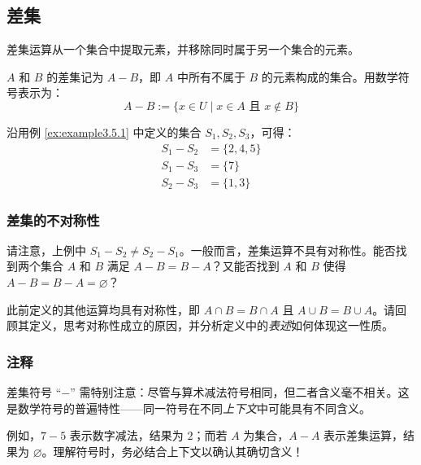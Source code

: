 \subsection{差集}

差集运算从一个集合中提取元素，并移除同时属于另一个集合的元素。

\begin{definition}
    $A$ 和 $B$ 的差集记为 $A - B$，即 $A$ 中所有不属于 $B$ 的元素构成的集合。用数学符号表示为：
    \[A - B := \{x \in U \mid x \in A \text{\ 且\ } x \notin B\}\]
\end{definition}

\begin{example}
    沿用例 \ref{ex:example3.5.1} 中定义的集合 $S_1, S_2, S_3$，可得：
    \begin{align*}
        S_1 - S_2 &= \{2, 4, 5\} \\
        S_1 - S_3 &= \{7\} \\
        S_2 - S_3 &= \{1,3\}
    \end{align*}
\end{example}

\subsubsection*{差集的不对称性}

请注意，上例中 $S_1 - S_2 \ne S_2 - S_1$。一般而言，差集运算不具有对称性。能否找到两个集合 $A$ 和 $B$ 满足 $A - B = B - A$？又能否找到 $A$ 和 $B$ 使得 $A - B = B - A = \varnothing$？

此前定义的其他运算均具有对称性，即 $A \cap B = B \cap A$ 且 $A \cup B = B \cup A$。请回顾其定义，思考对称性成立的原因，并分析定义中的\emph{表述}如何体现这一性质。

\subsubsection*{注释}

差集符号 ``$-$'' 需特别注意：尽管与算术减法符号相同，但二者含义毫不相关。这是数学符号的普遍特性——同一符号在不同\emph{上下文}中可能具有不同含义。

例如，$7 - 5$ 表示数字减法，结果为 $2$；而若 $A$ 为集合，$A - A$ 表示差集运算，结果为 $\varnothing$。理解符号时，务必结合上下文以确认其确切含义！
